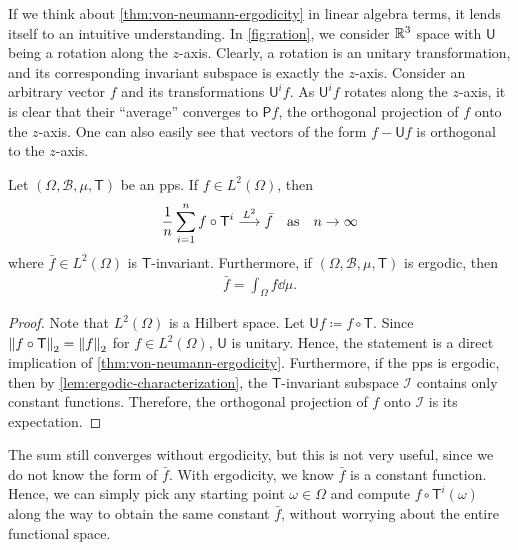 \documentclass[a4paper]{article}
\begin{document}
\begin{remark}
	If we think about \autoref{thm:von-neumann-ergodicity} in linear algebra terms,
	it lends itself to an intuitive understanding.
	In \autoref{fig:ration}, we consider $\mathbb{R}^3$ space with $\mathsf{U}$ being a rotation along the $z$-axis.
	Clearly, a rotation is an unitary transformation,
	and its corresponding invariant subspace is exactly the $z$-axis.
	Consider an arbitrary vector $f$ and its transformations $\mathsf{U}^{i}f$.
	As $\mathsf{U}^{i}f$ rotates along the $z$-axis,
	it is clear that their ``average'' converges to $\mathsf{P}f$, the orthogonal projection of $f$ onto the $z$-axis.
	One can also easily see that vectors of the form $f-\mathsf{U}f$ is orthogonal to the $z$-axis.
\end{remark}

\begin{corollary}\label{cor:von-neumann-ergodicity}
	Let $(\Omega,\mathcal{B},\mu,\mathsf{T})$ be an \gls{pps}.
	If $f\in L^2(\Omega)$,
	then
	\begin{align*}
		\frac1n \sum_{i=1}^{n} f\circ \mathsf{T}^i
		\overset{L^2}{\longrightarrow}
		\bar{f}
		\quad\text{as}\quad
		n\to\infty
	\end{align*}
	where $\bar{f}\in L^2(\Omega)$ is $\mathsf{T}$-invariant.
	Furthermore, if $(\Omega,\mathcal{B},\mu,\mathsf{T})$ is ergodic, then
	\begin{align*}
		\bar{f}=\int_{\Omega}f\dd\mu.
	\end{align*}
\end{corollary}

\begin{proof}
	Note that $L^2(\Omega)$ is a Hilbert space.
	Let $\mathsf{U}f\coloneqq f\circ\mathsf{T}$.
	Since $\left\|f\circ\mathsf{T}\right\|_{2}=\left\|f\right\|_{2}$ for $f\in L^2(\Omega)$, $\mathsf{U}$ is unitary.
	Hence, the statement is a direct implication of \autoref{thm:von-neumann-ergodicity}.
	Furthermore, if the \gls{pps} is ergodic, then by \autoref{lem:ergodic-characterization},
	the $\mathsf{T}$-invariant subspace $\mathcal{I}$ contains only constant functions.
	Therefore, the orthogonal projection of $f$ onto $\mathcal{I}$ is its expectation.
\end{proof}
\begin{remark}
	The sum still converges without ergodicity, but this is not very useful, since we do not know the form of $\bar{f}$.
	With ergodicity, we know $\bar{f}$ is a constant function.
	Hence, we can simply pick any starting point $\omega\in\Omega$
	and compute $f\circ\mathsf{T}^{i}(\omega)$ along the way to obtain the same constant $\bar{f}$,
	without worrying about the entire functional space.
\end{remark}
\end{document}
